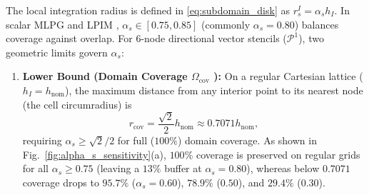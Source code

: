 \documentclass[VANCOUVER]{USG}
\begin{document}
The local integration radius is defined in \eqref{eq:subdomain_disk} as $r_s^I = \alpha_s h_I$. In scalar MLPG and LPIM \cite{atluri2002meshless, liu2009mesh}, $\alpha_s \in [0.75, 0.85]$ (commonly $\alpha_s = 0.80$) balances coverage against overlap. For 6-node directional vector stencils ($\mathcal{P}^1$), two geometric limits govern $\alpha_s$:
\begin{enumerate}
    \item \textbf{Lower Bound (Domain Coverage $\Omega_{\mathrm{cov}}$ \cite{atluri2002meshless, liu2009mesh}):} On a regular Cartesian lattice ($h_I = h_{\mathrm{nom}}$), the maximum distance from any interior point to its nearest node (the cell circumradius) is
          \begin{equation}
              r_{\mathrm{cov}} = \frac{\sqrt{2}}{2} h_{\mathrm{nom}} \approx 0.7071 h_{\mathrm{nom}},
              \label{eq:alpha_s_lower_bound}
          \end{equation}
          requiring $\alpha_s \ge \sqrt{2}/2$ for full ($100\%$) domain coverage. As shown in Fig.~\ref{fig:alpha_s_sensitivity}(a), $100\%$ coverage is preserved on regular grids for all $\alpha_s \ge 0.75$ (leaving a $13\%$ buffer at $\alpha_s = 0.80$), whereas below $0.7071$ coverage drops to $95.7\%$ ($\alpha_s = 0.60$), $78.9\%$ ($0.50$), and $29.4\%$ ($0.30$).
          

\end{enumerate}
\end{document}
